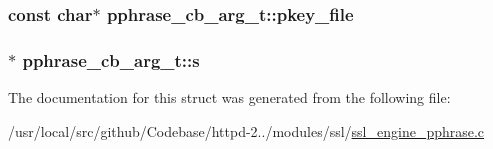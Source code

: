 \subsubsection[{\texorpdfstring{pkey\+\_\+file}{pkey_file}}]{\setlength{\rightskip}{0pt plus 5cm}const char$\ast$ pphrase\+\_\+cb\+\_\+arg\+\_\+t\+::pkey\+\_\+file}\hypertarget{structpphrase__cb__arg__t_afc01b5b93a45bd50c5aa697680921d65}{}\label{structpphrase__cb__arg__t_afc01b5b93a45bd50c5aa697680921d65}
\subsubsection[{\texorpdfstring{s}{s}}]{$\ast$ pphrase\+\_\+cb\+\_\+arg\+\_\+t\+::s}\hypertarget{structpphrase__cb__arg__t_a04abf5118944ca1717e080e3360337c7}{}\label{structpphrase__cb__arg__t_a04abf5118944ca1717e080e3360337c7}


The documentation for this struct was generated from the following file\+:\begin{DoxyCompactItemize}
\item 
/usr/local/src/github/\+Codebase/httpd-\/2../modules/ssl/\hyperlink{ssl__engine__pphrase_8c}{ssl\+\_\+engine\+\_\+pphrase.\+c}\end{DoxyCompactItemize}
